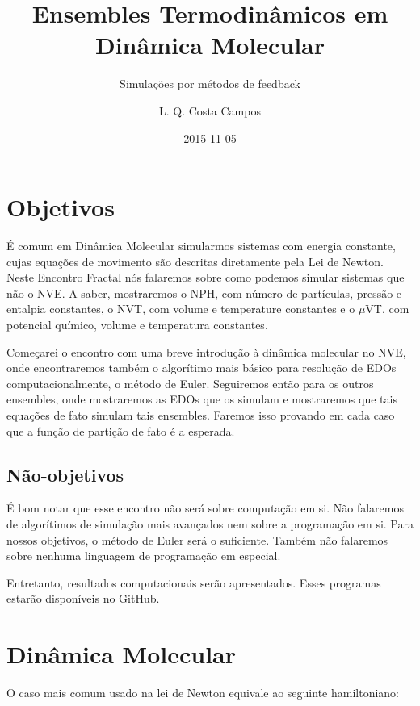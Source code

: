 \documentclass[twoside, a4paper]{scrartcl}
\begin{document}
\title{Ensembles Termodinâmicos em Dinâmica Molecular}
\subtitle{Simulações por métodos de feedback}
\author{L. Q. Costa Campos}
\date{2015-11-05}
\maketitle

\tableofcontents

\clearpage

\section{Objetivos}

É comum em Dinâmica Molecular simularmos sistemas com energia constante, cujas equações de movimento são descritas diretamente pela Lei de Newton. Neste Encontro Fractal nós falaremos sobre como podemos simular sistemas que não o NVE. A saber, mostraremos o NPH, com número de partículas, pressão e entalpia constantes, o NVT, com volume e temperature constantes e o $\mu$VT, com potencial químico, volume e temperatura constantes.

Começarei o encontro com uma breve introdução à dinâmica molecular no NVE, onde encontraremos também o algorítimo mais básico para resolução de EDOs computacionalmente, o método de Euler. Seguiremos então para os outros ensembles, onde mostraremos as EDOs que os simulam e mostraremos que tais equações de fato simulam tais ensembles. Faremos isso provando em cada caso que a função de partição de fato é a esperada.

\subsection{Não-objetivos}

É bom notar que esse encontro não será sobre computação em si. Não falaremos de algorítimos de simulação mais avançados nem sobre a programação em si. Para nossos objetivos, o método de Euler será o suficiente. Também não falaremos sobre nenhuma linguagem de programação em especial. 

Entretanto, resultados computacionais serão apresentados. Esses programas estarão disponíveis no GitHub.

\section{Dinâmica Molecular}

O caso mais comum usado na lei de Newton equivale ao seguinte hamiltoniano:
\end{document}
